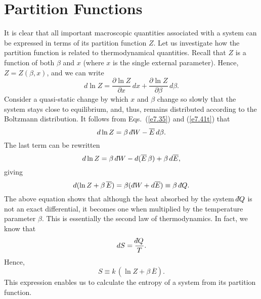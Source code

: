 \section{Partition Functions}\label{s7.6}
It is clear that all important macroscopic quantities
associated with a system  can be expressed in terms
of its partition function $Z$. Let us investigate how 
the partition function is related to thermodynamical quantities. 
Recall that $Z$ is a function of both $\beta$ and $x$ (where $x$ is the single
external parameter). Hence, $Z= Z(\beta, x)$, and we can write
\begin{equation}
d \ln Z = \frac{\partial \ln Z}{\partial x}\,dx + \frac{\partial \ln Z}
{\partial \beta}\,d\beta.
\end{equation}
Consider a quasi-static change by which $x$ and $\beta$ change so slowly that
the system stays close to equilibrium, and, thus, remains
 distributed according to the
Boltzmann distribution. It follows from Eqs.~(\ref{e7.35}) and (\ref{e7.41t}) that
\begin{equation}
d\ln Z = \beta\,\, \dbar W - \overline{E}\, d\beta.
\end{equation}
The last term can be rewritten
\begin{equation}
d \ln Z = \beta\, \,\dbar W - d(\overline{E} \,\beta) +\beta \,d\overline{E},
\end{equation}
giving
\begin{equation}
d(\ln Z +\beta\, \overline{E}) = \beta (\,
\dbar W +d\overline{E}) \equiv \beta \,\,\dbar Q.
\end{equation}
The above equation shows that although the heat absorbed by the system
$\dbar Q$ is not
an exact differential, it becomes one when multiplied by the temperature
parameter $\beta$. This is essentially the second law of thermodynamics. In fact,
we know that
\begin{equation}
dS = \frac{\dbar Q}{T}.
\end{equation}
Hence,
\begin{equation}
S  \equiv k\,(\ln Z +\beta\,\overline{E}).\label{e7.56}
\end{equation}
This expression  enables us to calculate the entropy of a system
from its partition function.

